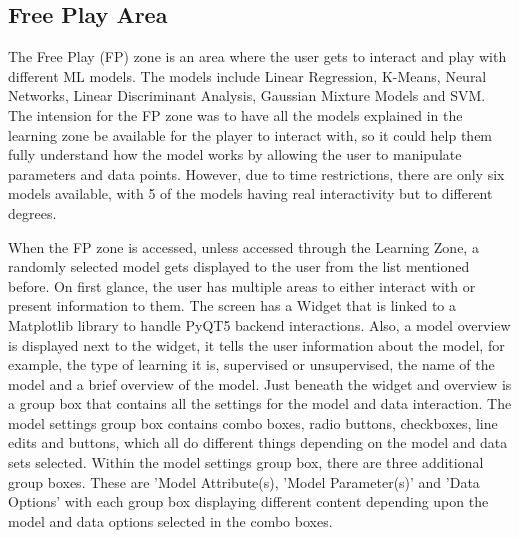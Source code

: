 	\subsection{Free Play Area}
	The Free Play (FP) zone is an area where the user gets to interact and play with different ML models. The models include Linear Regression, K-Means, Neural Networks, Linear Discriminant Analysis, Gaussian Mixture Models and SVM. The intension for the FP zone was to have all the models explained in the learning zone be available for the player to interact with, so it could help them fully understand how the model works by allowing the user to manipulate parameters and data points. However, due to time restrictions, there are only six models available, with 5 of the models having real interactivity but to different degrees.  
	
	When the FP zone is accessed, unless accessed through the Learning Zone, a randomly selected model gets displayed to the user from the list mentioned before. On first glance, the user has multiple areas to either interact with or present information to them. The screen has a Widget that is linked to a Matplotlib library to handle PyQT5 backend interactions. Also, a model overview is displayed next to the widget, it tells the user information about the model, for example, the type of learning it is, supervised or unsupervised, the name of the model and a brief overview of the model. Just beneath the widget and overview is a group box that contains all the settings for the model and data interaction. The model settings group box contains combo boxes, radio buttons, checkboxes,  line edits and buttons, which all do different things depending on the model and data sets selected. Within the model settings group box, there are three additional group boxes. These are 'Model Attribute(s), 'Model Parameter(s)' and 'Data Options' with each group box displaying different content depending upon the model and data options selected in the combo boxes. 
	
